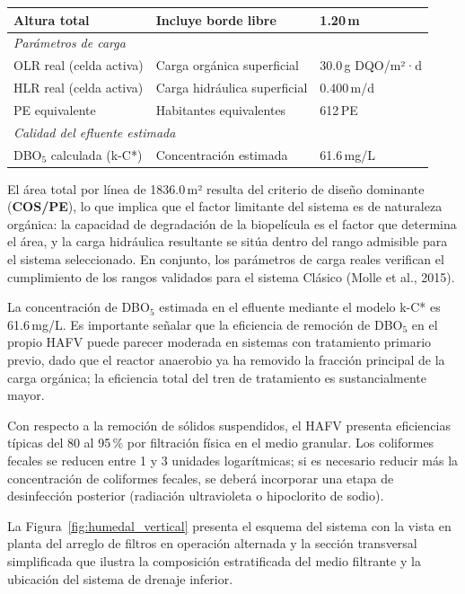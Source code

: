 \documentclass[12pt,a4paper]{article}
\begin{document}
\begin{longtable}{p{4.1cm}p{4.8cm}p{4.2cm}}
\quad Altura total & Incluye borde libre & 1.20\,m \\
\midrule
\multicolumn{3}{l}{\textit{Parámetros de carga}} \\
\quad OLR real (celda activa) & Carga orgánica superficial & 30.0\,g DQO/m²·d \\
\quad HLR real (celda activa) & Carga hidráulica superficial & 0.400\,m/d \\
\quad PE equivalente & Habitantes equivalentes & 612\,PE \\
\midrule
\multicolumn{3}{l}{\textit{Calidad del efluente estimada}} \\
\quad DBO$_5$ calculada (k-C*) & Concentración estimada & 61.6\,mg/L \\
\end{longtable}
\endgroup

El área total por línea de 1836.0\,m² resulta del criterio de diseño dominante (\textbf{COS/PE}), lo que implica que el factor limitante del sistema es de naturaleza orgánica: la capacidad de degradación de la biopelícula es el factor que determina el área, y la carga hidráulica resultante se sitúa dentro del rango admisible para el sistema seleccionado. En conjunto, los parámetros de carga reales verifican el cumplimiento de los rangos validados para el sistema Clásico (Molle et al., 2015).

La concentración de DBO$_5$ estimada en el efluente mediante el modelo k-C* es 61.6\,mg/L. Es importante señalar que la eficiencia de remoción de DBO$_5$ en el propio HAFV puede parecer moderada en sistemas con tratamiento primario previo, dado que el reactor anaerobio ya ha removido la fracción principal de la carga orgánica; la eficiencia total del tren de tratamiento es sustancialmente mayor.

Con respecto a la remoción de sólidos suspendidos, el HAFV presenta eficiencias típicas del 80 al 95\,\% por filtración física en el medio granular. Los coliformes fecales se reducen entre 1 y 3 unidades logarítmicas; si es necesario reducir más la concentración de coliformes fecales, se deberá incorporar una etapa de desinfección posterior (radiación ultravioleta o hipoclorito de sodio).

La Figura~\ref{fig:humedal_vertical} presenta el esquema del sistema con la vista en planta del arreglo de filtros en operación alternada y la sección transversal simplificada que ilustra la composición estratificada del medio filtrante y la ubicación del sistema de drenaje inferior.
\end{document}
